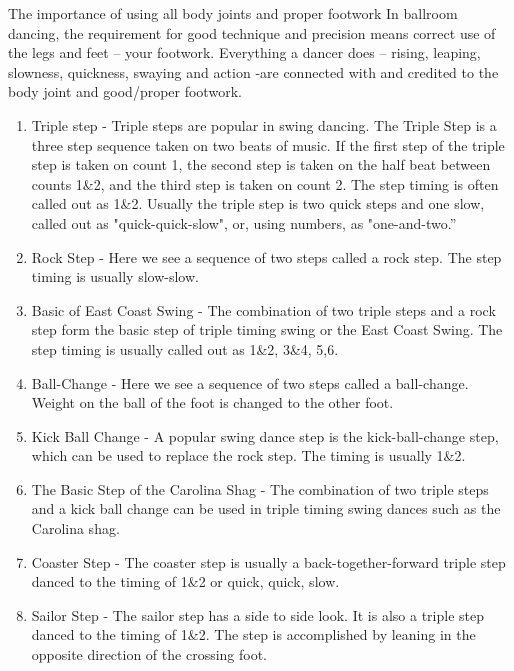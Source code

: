 \documentclass{article}
\begin{document}
The importance of using all body joints and proper footwork
 In ballroom dancing, the requirement for good technique and precision means correct use of the legs and feet – your footwork. Everything a dancer does – rising, leaping, slowness, quickness, swaying and action -are connected with and credited to the body joint and good/proper footwork.
\begin{enumerate}
\item Triple step - Triple steps are popular in swing dancing. The Triple Step is a three step sequence taken on two beats of music. If the first step of the triple step is taken on count 1, the second step is taken on the half beat between counts 1\&2, and the third step is taken on count 2. The step timing is often called out as 1\&2. Usually the triple step is two quick steps and one slow, called out as "quick-quick-slow", or, using numbers, as "one-and-two.”
 
\item Rock Step - Here we see a sequence of two steps called a rock step. The step timing is usually slow-slow.
 
 \item  Basic of East Coast Swing - The combination of two triple steps and a rock step form the basic step of triple timing swing or the East Coast Swing. The step timing is usually called out as 1\&2, 3\&4, 5,6.
 
 \item  Ball-Change - Here we see a sequence of two steps called a ball-change. Weight on the ball of the foot is changed to the other foot.
 
 \item  Kick Ball Change - A popular swing dance step is the kick-ball-change step, which can be used to replace the rock step. The timing is usually 1\&2.
 
 \item  The Basic Step of the Carolina Shag - The combination of two triple steps and a kick ball change can be used in triple timing swing dances such as the Carolina shag.
 
 \item  Coaster Step - The coaster step is usually a back-together-forward triple step danced to the timing of 1\&2 or quick, quick, slow.
 
 \item  Sailor Step - The sailor step has a side to side look. It is also a triple step danced to the timing of 1\&2. The step is accomplished by leaning in the opposite direction of the crossing foot.
 

\end{enumerate}
\end{document}
